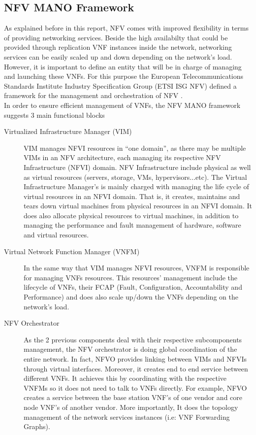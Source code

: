\subsection{NFV MANO Framework } 
As explained before in this report, NFV comes with improved flexibility in terms of providing networking services. Beside the high availabilty that could be provided through replication VNF instances inside the network, networking services can be easily scaled up and down depending on the network's load. However, it is important to define an entity that will be in charge of managing and launching these VNFs. For this purpose the European Telecommunications Standards Institute Industry Specification Group (ETSI ISG NFV) defined a framework for the management and orchestration of NFV \cite{mano}.\\
In order to ensure efficient management of VNFs, the NFV MANO framework suggests 3 main functional blocks \cite{mano2}
\begin{description}
\item[Virtualized Infrastructure Manager (VIM)] VIM manages NFVI resources in “one domain”, as there may be multiple VIMs in an NFV architecture, each managing its respective NFV Infrastructure (NFVI) domain. NFV Infrastructure include physical as well as virtual resources (servers, storage, VMs, hypervisors...etc). The Virtual Infrastructure Manager's is mainly charged with managing the life cycle of virtual resources in an NFVI domain. That is, it creates, maintains and tears down virtual machines from physical resources in an NFVI domain. It does also allocate physical resources to  virtual machines, in addition to managing the performance and fault management of hardware, software and virtual resources.
\item[Virtual Network Function Manager (VNFM)] In the same way that VIM manages NFVI resources, VNFM is responsible for managing VNFs resources. This resources' management include the lifecycle of VNFs, their FCAP (Fault, Configuration, Accountability and Performance) and does also scale up/down the VNFs depending on the network's load.
\item[NFV Orchestrator] As the 2 previous components deal with their respective subcomponents management, the NFV orchestrator is doing global coordination of the entire network. In fact, NFVO provides linking between VIMs and NFVIs through virtual interfaces. Moreover, it creates end to end service between different VNFs. It achieves this by coordinating with the respective VNFMs so it does not need to talk to VNFs directly. For example, NFVO creates a service between the base station VNF’s of one vendor and core node VNF’s of another vendor. More importantly, It does the topology management of the network services instances (i.e: VNF Forwarding Graphs).
\end{description} 
